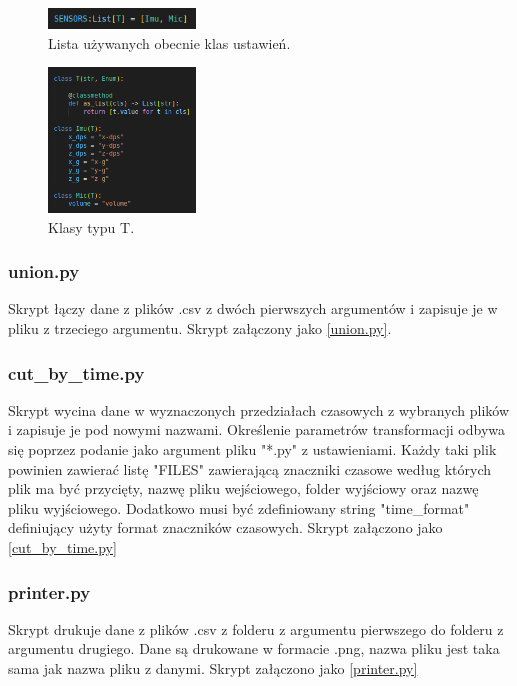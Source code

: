 \documentclass[12pt,oneside,a4paper]{book}
\theoremstyle{break}
\begin{document}
\begin{figure}[H]
    \begin{center}
        \includegraphics[width=0.35\textwidth]{typ-T-list.png}
        \caption{Lista używanych obecnie klas ustawień.}
        \label{rys:typ-T-list}
    \end{center}
\end{figure}


\begin{figure}[H]
    \begin{center}
        \includegraphics[width=0.35\textwidth]{typ-T.png}
        \caption{Klasy typu T.}
        \label{rys:typ-T}
    \end{center}
\end{figure}


\subsubsection{union.py}
Skrypt łączy dane z plików .csv z dwóch pierwszych argumentów i 
zapisuje je w pliku z trzeciego argumentu. Skrypt załączony jako
\ref*{union.py}.

\subsubsection{cut\_by\_time.py}
Skrypt wycina dane w wyznaczonych przedziałach czasowych z 
wybranych plików i zapisuje je pod nowymi nazwami.
Określenie parametrów transformacji odbywa się poprzez podanie jako 
argument pliku "*.py" z ustawieniami.
Każdy taki plik powinien zawierać listę "FILES" zawierającą znaczniki 
czasowe według których plik ma być przycięty, nazwę pliku wejściowego,
folder wyjściowy oraz nazwę pliku wyjściowego. Dodatkowo musi być 
zdefiniowany string "time\_format" definiujący użyty format 
znaczników czasowych. Skrypt załączono jako \ref*{cut_by_time.py}

\subsubsection{printer.py}
Skrypt drukuje dane z plików .csv z folderu z argumentu pierwszego 
do folderu z argumentu drugiego.
Dane są drukowane w formacie .png, nazwa pliku jest taka sama jak 
nazwa pliku z danymi. 
Skrypt załączono jako \ref*{printer.py}
\end{document}
